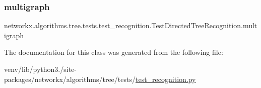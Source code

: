 \subsubsection{\texorpdfstring{multigraph}{multigraph}}
{\footnotesize\ttfamily networkx.\+algorithms.\+tree.\+tests.\+test\+\_\+recognition.\+Test\+Directed\+Tree\+Recognition.\+multigraph\hspace{0.3cm}{\ttfamily [static]}}



The documentation for this class was generated from the following file\+:\begin{DoxyCompactItemize}
\item 
venv/lib/python3./site-\/packages/networkx/algorithms/tree/tests/\hyperlink{test__recognition_8py}{test\+\_\+recognition.\+py}\end{DoxyCompactItemize}
